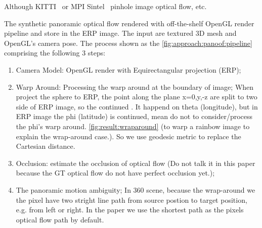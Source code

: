 Although KITTI~\cite{Menze2018JPRS} or MPI Sintel~\cite{ButleWSB2012} pinhole image optical flow, etc.

The synthetic panoramic optical flow rendered with off-the-shelf OpenGL render pipeline and store in the ERP image.
The input are textured 3D mesh and OpenGL's camera pose.
The process shown as the \cref{fig:approach:panoof:pipeline} comprising the following 3 steps:

\begin{enumerate}
	\item Camera Model: OpenGL render with Equirectangular projection (ERP);
	\item Warp Around: Processing the warp around at the boundary of image; When project the sphere to ERP, the point along the plane x=0,y,-z are split to two side of ERP image, so the continued . It happend on theta (longitude), but in ERP image the phi (latitude) is continued, mean do not to consider/process the phi's warp around. \cref{fig:result:wraparound} (to warp a rainbow image to explain the wrap-around case.). So we use geodesic metric to replace the Cartesian distance.
	\item Occlusion: estimate the occlusion of optical flow (Do not talk it in this paper because the GT optical flow do not have perfect occlusion yet.);
	\item The panoramic motion ambiguity; In 360 scene, because the wrap-around we the pixel have two stright line path from source postion to target position, e.g. from left or right. In the paper we use the shortest path as the pixels optical flow path by default.
\end{enumerate}




%
